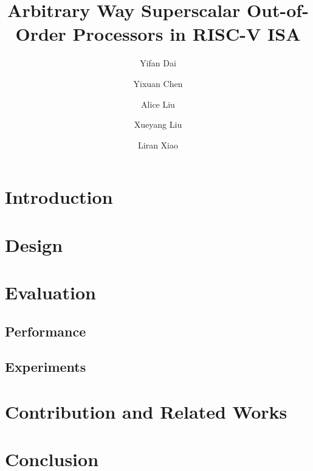 \documentclass[sigplan,review]{acmart}\settopmatter{printfolios=true,printccs=false,printacmref=false}
\begin{document}
\title[]{Arbitrary Way Superscalar Out-of-Order Processors in RISC-V ISA}

\author{Yifan Dai} 
\author{Yixuan Chen}
\author{Alice Liu}
\author{Xueyang Liu}
\author{Liran Xiao}

\begin{abstract}
  \lipsum[1]
\end{abstract}


\maketitle

\section{Introduction}



\section{Design}













\section{Evaluation}

\subsection{Performance}



\subsection{Experiments}







\section{Contribution and Related Works}



\section{Conclusion}




\end{document}
